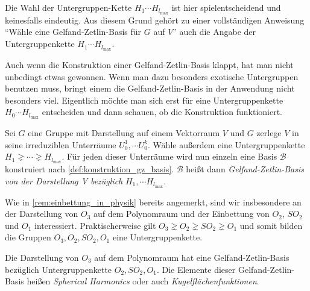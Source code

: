 \begin{remark}
		Die Wahl der Untergruppen-Kette $H_1\cdots H_{l_{\text{max}}}$ ist hier spielentscheidend und keinesfalls eindeutig. Aus diesem Grund gehört zu einer vollständigen Anweisung \enquote{Wähle eine Gelfand-Zetlin-Basis für $G$ auf $V$} auch die Angabe der Untergruppenkette $H_1\cdots H_{l_{\text{max}}}$.
\end{remark}
\begin{remark}
	Auch wenn die Konstruktion einer Gelfand-Zetlin-Basis klappt, hat man nicht unbedingt etwas gewonnen. Wenn man dazu besonders exotische Untergruppen benutzen muss, bringt einem die Gelfand-Zetlin-Basis in der Anwendung nicht besonders viel. Eigentlich möchte man sich erst für eine Untergruppenkette $H_0\cdots H_{l_{\text{max}}}$ entscheiden und dann schauen, ob die Konstruktion funktioniert.
\end{remark}
\begin{definition}[$\Gae\jae\el\soft\fae\aaa\en\dae$-$\Zae\jae\tae\el\iii\en$-$\Bae\aaa\sae\aaa$]
	\label{def:gz_basis}
	Sei $G$ eine Gruppe mit Darstellung auf einem Vektorraum $V$ und $G$ zerlege $V$ in seine irreduziblen Unterräume $U^1_0,\cdots U^k_0$. Wähle außerdem eine Untergruppenkette $H_1 \gneq\cdots\gneq H_{l_{\text{max}}}$. Für jeden dieser Unterräume wird nun einzeln eine Basis $\mathcal{B}$ konstruiert nach \ref{def:konstruktion_gz_basis}. $\mathcal{B}$ heißt dann \emph{Gelfand-Zetlin-Basis von der Darstellung V bezüglich} $H_1,\cdots H_{l_{\text{max}}}$. 
\end{definition}

\begin{remark}
	Wie in \ref{rem:einbettung_in_physik} bereits angemerkt, sind wir insbesondere an der Darstellung von $O_3$ auf dem Polynomraum und der Einbettung von $O_2$, $SO_2$ und $O_1$ interessiert. Praktischerweise gilt $O_3\gneq O_2\gneq SO_2 \gneq O_1$ und somit bilden die Gruppen $O_3, O_2,SO_2,O_1$ eine Untergruppenkette.
\end{remark}

\begin{maintheorem}
	Die Darstellung von $O_3$ auf dem Polynomraum hat eine Gelfand-Zetlin-Basis bezüglich Untergruppenkette $O_2,SO_2,O_1$. Die Elemente dieser Gelfand-Zetlin-Basis heißen \emph{Spherical Harmonics} oder auch \emph{Kugelflächenfunktionen}.
\end{maintheorem}